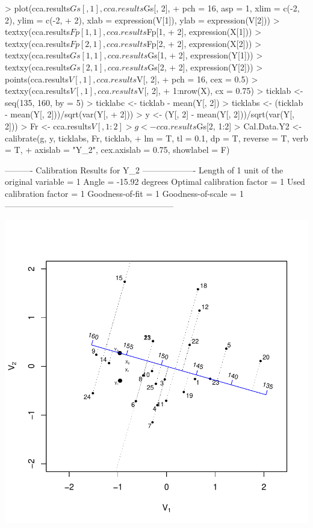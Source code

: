 \documentclass[a4paper]{article}
\begin{document}
\begin{Schunk}
\begin{Sinput}
> plot(cca.results$Gs[, 1], cca.results$Gs[, 2], 
+     pch = 16, asp = 1, xlim = c(-2, 2), ylim = c(-2, 
+         2), xlab = expression(V[1]), ylab = expression(V[2]))
> textxy(cca.results$Fp[1, 1], cca.results$Fp[1, 
+     2], expression(X[1]))
> textxy(cca.results$Fp[2, 1], cca.results$Fp[2, 
+     2], expression(X[2]))
> textxy(cca.results$Gs[1, 1], cca.results$Gs[1, 
+     2], expression(Y[1]))
> textxy(cca.results$Gs[2, 1], cca.results$Gs[2, 
+     2], expression(Y[2]))
> points(cca.results$V[, 1], cca.results$V[, 2], 
+     pch = 16, cex = 0.5)
> textxy(cca.results$V[, 1], cca.results$V[, 2], 
+     1:nrow(X), cx = 0.75)
> ticklab <- seq(135, 160, by = 5)
> ticklabc <- ticklab - mean(Y[, 2])
> ticklabs <- (ticklab - mean(Y[, 2]))/sqrt(var(Y[, 
+     2]))
> y <- (Y[, 2] - mean(Y[, 2]))/sqrt(var(Y[, 2]))
> Fr <- cca.results$V[, 1:2]
> g <- cca.results$Gs[2, 1:2]
> Cal.Data.Y2 <- calibrate(g, y, ticklabs, Fr, ticklab, 
+     lm = T, tl = 0.1, dp = T, reverse = T, verb = T, 
+     axislab = "Y_2", cex.axislab = 0.75, showlabel = F)
\end{Sinput}
\begin{Soutput}
---------- Calibration Results for  Y_2  -------------------
Length of 1 unit of the original variable =  1  
Angle                                     =  -15.92 degrees
Optimal calibration factor                =  1  
Used calibration factor                   =  1  
Goodness-of-fit                           =  1  
Goodness-of-scale                         =  1  
------------------------------------------------------------
\end{Soutput}
\end{Schunk}
\includegraphics{CalibrationGuide-015}
\end{document}
